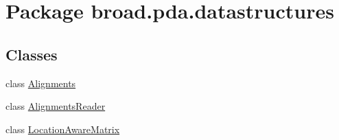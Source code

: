 \hypertarget{namespacebroad_1_1pda_1_1datastructures}{\section{Package broad.\+pda.\+datastructures}
\label{namespacebroad_1_1pda_1_1datastructures}
}
\subsection*{Classes}
\begin{DoxyCompactItemize}
\item 
class \hyperlink{classbroad_1_1pda_1_1datastructures_1_1_alignments}{Alignments}
\item 
class \hyperlink{classbroad_1_1pda_1_1datastructures_1_1_alignments_reader}{Alignments\+Reader}
\item 
class \hyperlink{classbroad_1_1pda_1_1datastructures_1_1_location_aware_matrix}{Location\+Aware\+Matrix}
\end{DoxyCompactItemize}
